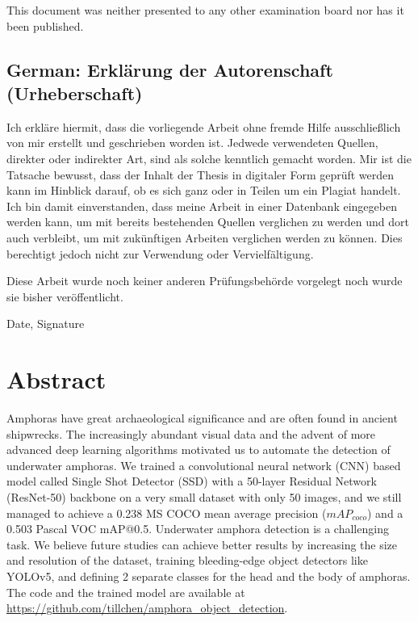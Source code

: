 \documentclass[a4paper, 11pt, oneside]{article}
\begin{document}
This document was neither presented to any other examination board
nor has it been published.

\subsection*{German: Erklärung der Autorenschaft (Urheberschaft)}

Ich erkläre hiermit, dass die vorliegende Arbeit ohne fremde Hilfe
ausschließlich von mir erstellt und geschrieben worden ist. Jedwede
verwendeten Quellen, direkter oder indirekter Art, sind als solche
kenntlich gemacht worden. Mir ist die Tatsache bewusst, dass der
Inhalt der Thesis in digitaler Form geprüft werden kann im Hinblick
darauf, ob es sich ganz oder in Teilen um ein Plagiat handelt. Ich
bin damit einverstanden, dass meine Arbeit in einer Datenbank
eingegeben werden kann, um mit bereits bestehenden Quellen
verglichen zu werden und dort auch verbleibt, um mit zukünftigen
Arbeiten verglichen werden zu können. Dies berechtigt jedoch nicht
zur Verwendung oder Vervielfältigung.

Diese Arbeit wurde noch keiner anderen Prüfungsbehörde vorgelegt
noch wurde sie bisher veröffentlicht.

\vspace{20mm}

Date, Signature

\newpage

\section*{Abstract}

Amphoras have great archaeological significance and are often found in ancient shipwrecks. The increasingly abundant
visual data and the advent of more advanced deep learning algorithms motivated us to automate the detection of
underwater amphoras. We trained a convolutional neural network (CNN) based model called Single Shot Detector (SSD) with
a 50-layer Residual Network (ResNet-50) backbone on a very small dataset with only 50 images, and we still managed to
achieve a 0.238 MS COCO mean average precision ($mAP_{coco}$) and a 0.503 Pascal VOC mAP@0.5. Underwater amphora
detection is a challenging task. We believe future studies can achieve better results by increasing the size and
resolution of the dataset, training bleeding-edge object detectors like YOLOv5, and defining 2 separate classes for
the head and the body of amphoras. The code and the trained model are available at
\url{https://github.com/tillchen/amphora_object_detection}.
\end{document}
